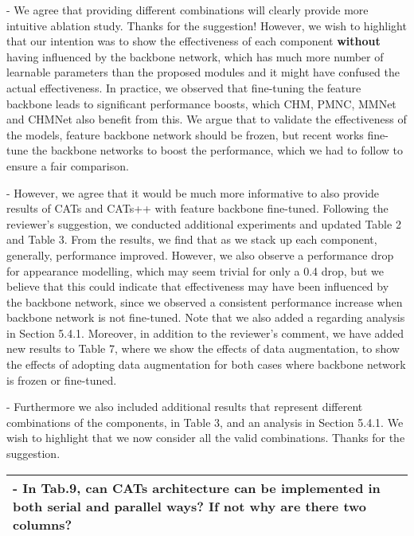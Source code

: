 \documentclass[11pt,draftclsnofoot,onecolumn]{IEEEtran}
\begin{document}
- We agree that providing different combinations will clearly provide more intuitive ablation study. Thanks for the suggestion! However, we wish to highlight that our intention was to show the effectiveness of each component \textbf{without} having influenced by the backbone network, which has much more number of learnable parameters than the proposed modules and it might have confused the actual effectiveness. In practice, we observed that fine-tuning the feature backbone leads to significant performance boosts, which CHM, PMNC, MMNet and CHMNet also benefit from this. We argue that to validate the effectiveness of the models, feature backbone network should be frozen, but recent works fine-tune the backbone networks to boost the performance, which we had to follow to ensure a fair comparison. 

- However, we agree that it would be much more informative to also provide results of CATs and CATs++ with feature backbone fine-tuned.  Following the reviewer's suggestion, we conducted additional experiments and updated Table 2 and Table 3. From the results, we find that as we stack up each component, generally, performance improved. However, we also observe a performance drop for appearance modelling, which may seem trivial for only a 0.4  drop, but we believe that this could indicate that effectiveness may have been influenced by the backbone network, since we observed a consistent performance increase when backbone network is not fine-tuned. Note that we also added a regarding analysis in Section 5.4.1. Moreover, in addition to the reviewer's comment, we have added new results to Table 7, where we show the effects of data augmentation, to show the effects of adopting data augmentation for both cases where backbone network is frozen or fine-tuned.

-  Furthermore we also included additional results that represent different combinations of the components, in Table 3, and an analysis in Section 5.4.1. We wish to highlight that we now consider all the valid combinations. Thanks for the suggestion.  


\newpage

\begin{longtable}{|p{16cm}|}
	\hline 





\textbf{-
In Tab.9, can CATs architecture can be implemented in both serial and parallel ways? If not why are there two columns?}\\

	\hline
\end{longtable}
\end{document}
